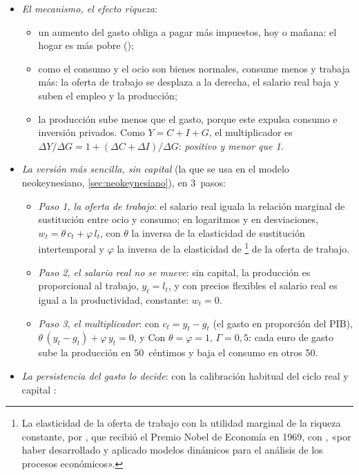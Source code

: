 \documentclass[11pt]{article}
\begin{document}
\begin{itemize}
\item \emph{El mecanismo, el efecto riqueza}:
  \begin{itemize}
  \item un aumento del gasto obliga a pagar más impuestos, hoy o mañana: el hogar es más pobre ();
  \item como el consumo y el ocio son bienes normales, consume menos y trabaja más: la oferta de trabajo se desplaza a la derecha, el salario real baja y suben el empleo y la producción;
  \item la producción sube menos que el gasto, porque este expulsa consumo e inversión privados. Como $Y=C+I+G$, el multiplicador es $\Delta Y/\Delta G=1+(\Delta C+\Delta I)/\Delta G$: \emph{positivo y menor que 1}.
  \end{itemize}
\item \emph{La versión más sencilla, sin capital} (la que se usa en el modelo neokeynesiano, \ref{sec:neokeynesiano}), en 3~pasos\nocite{Woodford2011Simple}:
  \begin{itemize}
  \item \emph{Paso 1, la oferta de trabajo}: el salario real iguala la relación marginal de sustitución entre ocio y consumo; en logaritmos y en desviaciones, $w_t=\theta\,c_t+\varphi\,l_t$, con $\theta$ la inversa de la elasticidad de sustitución intertemporal y $\varphi$ la inversa de la elasticidad de \footnote{La elasticidad de la oferta de trabajo con la utilidad marginal de la riqueza constante, por , que recibió el Premio Nobel de Economía en 1969, con , «por haber desarrollado y aplicado modelos dinámicos para el análisis de los procesos económicos»\nocite{Nobel1969}.} de la oferta de trabajo.
  \item \emph{Paso 2, el salario real no se mueve}: sin capital, la producción es proporcional al trabajo, $y_t=l_t$, y con precios flexibles el salario real es igual a la productividad, constante: $w_t=0$.
  \item \emph{Paso 3, el multiplicador}: con $c_t=y_t-g_t$ (el gasto en proporción del PIB), $\theta\,(y_t-g_t)+\varphi\,y_t=0$, y
    Con $\theta=\varphi=1$, $\Gamma=0{,}5$: cada euro de gasto sube la producción en 50~céntimos y baja el consumo en otros 50.
  \end{itemize}
\item \emph{La persistencia del gasto lo decide}: con la calibración habitual del ciclo real y capital\nocite{BaxterKing1993Fiscal} :

\end{itemize}
\end{document}
